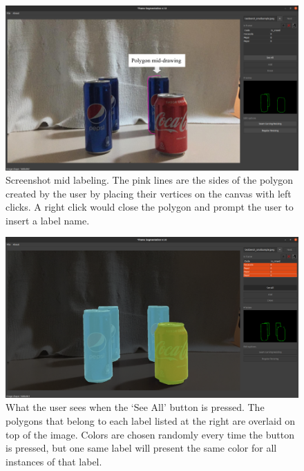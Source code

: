 \documentclass[../main.tex]{subfiles}
\begin{document}
\begin{figure}[H]
    \centering
    \includegraphics[width=1\linewidth]{images/gui_midlabeling_annotations.png}
    \caption{Screenshot mid labeling. The pink lines are the sides of the polygon created by the user by placing their vertices on the canvas with left clicks. A right click would close the polygon and prompt the user to insert a label name.}
    \label{fig:gui_midlabeling_annotations}
\end{figure}

\begin{figure}[H]
    \centering
    \includegraphics[width=1\linewidth]{images/gui_labeledimg_mask.png}
    \caption{What the user sees when the `See All' button is pressed. The polygons that belong to each label listed at the right are overlaid on top of the image. Colors are chosen randomly every time the button is pressed, but one same label will present the same color for all instances of that label.}
    \label{fig:gui_labeledimg_mask}
\end{figure}
\end{document}
